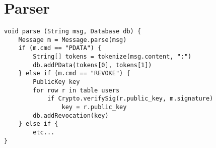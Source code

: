 \section{Parser}
\begin{lstlisting}
void parse (String msg, Database db) {
    Message m = Message.parse(msg)
    if (m.cmd == "PDATA") {
        String[] tokens = tokenize(msg.content, ":")
        db.addPData(tokens[0], tokens[1])
    } else if (m.cmd == "REVOKE") {
        PublicKey key
        for row r in table users
            if Crypto.verifySig(r.public_key, m.signature)
                key = r.public_key
        db.addRevocation(key)
    } else if {
        etc...
}
\end{lstlisting}
